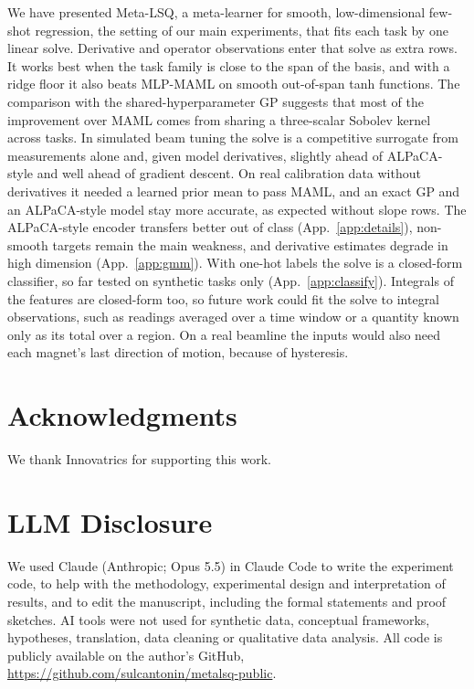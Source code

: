 \documentclass[fullpaper,final]{nldl}
\theoremstyle{plain}
\theoremstyle{definition}
\begin{document}
We have presented Meta-LSQ, a meta-learner for smooth, low-dimensional few-shot
regression, the setting of our main experiments, that fits each task by one linear
solve. Derivative and operator observations enter that solve as extra rows. It works best when
the task family is close to the span of the basis, and with a ridge floor it also
beats MLP-MAML on smooth out-of-span tanh functions. The comparison with the
shared-hyperparameter GP suggests that most of the improvement over MAML comes from
sharing a three-scalar Sobolev kernel across tasks. In simulated beam tuning the
solve is a competitive surrogate from measurements alone and, given model
derivatives, slightly ahead of ALPaCA-style and well ahead of gradient descent. On real calibration data without derivatives it needed a
learned prior mean to pass MAML, and an exact GP and an ALPaCA-style model stay
more accurate, as expected without slope rows. The ALPaCA-style encoder transfers better out of class
(App.~\ref{app:details}), non-smooth targets remain the main weakness, and derivative
estimates degrade in high dimension (App.~\ref{app:gmm}). With one-hot labels the
solve is a closed-form classifier, so far tested on synthetic tasks only
(App.~\ref{app:classify}). Integrals of the features are closed-form too, so future work
could fit the solve to integral observations, such as readings averaged over a time
window or a quantity known only as its total over a region. On a real beamline the inputs
would also need each magnet's last direction of motion, because of hysteresis.
\label{main:end}

\section*{Acknowledgments}
We thank Innovatrics for supporting this work.

\section*{LLM Disclosure}
We used Claude (Anthropic; Opus 5.5) in Claude Code to write the experiment
code, to help with the methodology, experimental design and interpretation of
results, and to edit the manuscript, including the formal statements and proof
sketches. AI tools were not used for synthetic data, conceptual frameworks,
hypotheses, translation, data cleaning or qualitative data analysis. All code is
publicly available on the author's GitHub,
\url{https://github.com/sulcantonin/metalsq-public}.
\label{disclosure:end}
\end{document}
